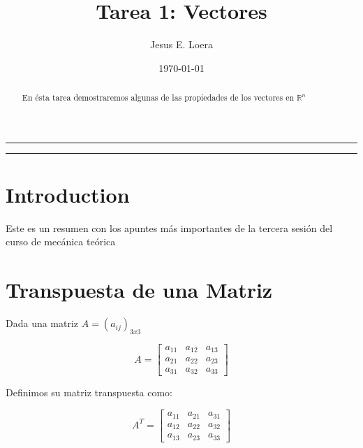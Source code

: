 \documentclass{article}
\title{Tarea 1: Vectores}
\author{Jesus E. Loera}
\date{\today}
\begin{document}
\maketitle      			%

\tableofcontents			%

\begin{center}
	\rule[0mm]{150mm}{0.1mm}		%
	\end{center}
	
	
\begin{abstract}			%

	\noindent 				%
	En ésta tarea demostraremos algunas de las propiedades de los vectores en 
	$\mathbb{R}^{n}$
	\end{abstract}
	
\begin{center}
	\rule[0mm]{150mm}{0.1mm}
	\end{center}

\section*{Introduction}		%
                            
    Este es un resumen con los apuntes más importantes de la tercera sesión del curso de mecánica teórica

\section{Transpuesta de una Matriz}


    Dada una matriz $ A = (a_{ij})_{3x3} $

    \begin{equation}
        A= \begin{bmatrix}
                a_{11} & a_{12} & a_{13} \\
                a_{21} & a_{22} & a_{23} \\
                a_{31} & a_{32} & a_{33} 
           \end{bmatrix}
    \end{equation}

    Definimos su matriz transpuesta como:

    \begin{equation}
      A^{T}= \begin{bmatrix}
              a_{11} & a_{21} & a_{31} \\
              a_{12} & a_{22} & a_{32} \\
              a_{13} & a_{23} & a_{33} 
      \end{bmatrix}
    \end{equation}
\end{document}
